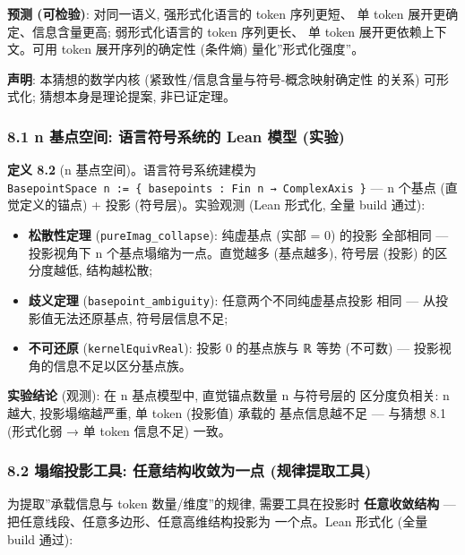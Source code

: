 \documentclass[
]{article}
\providecommand{\tightlist}{%
  \setlength{\itemsep}{0pt}\setlength{\parskip}{0pt}}
\begin{document}
\textbf{预测 (可检验)}: 对同一语义, 强形式化语言的 token 序列更短、 单
token 展开更确定、信息含量更高; 弱形式化语言的 token 序列更长、 单 token
展开更依赖上下文。可用 token 展开序列的确定性 (条件熵)
量化''形式化强度''。

\textbf{声明}: 本猜想的数学内核 (紧致性/信息含量与符号-概念映射确定性
的关系) 可形式化; 猜想本身是理论提案, 非已证定理。

\subsubsection{8.1 n 基点空间: 语言符号系统的 Lean 模型
(实验)}\label{n-ux57faux70b9ux7a7aux95f4-ux8bedux8a00ux7b26ux53f7ux7cfbux7edfux7684-lean-ux6a21ux578b-ux5b9eux9a8c}

\textbf{定义 8.2} (n 基点空间)。语言符号系统建模为
\texttt{BasepointSpace\ n\ :=\ \{\ basepoints\ :\ Fin\ n\ →\ ComplexAxis\ \}}
--- n 个基点 (直觉定义的锚点) + 投影 (符号层)。实验观测 (Lean 形式化,
全量 build 通过):

\begin{itemize}
\tightlist
\item
  \textbf{松散性定理} (\texttt{pureImag\_collapse}): 纯虚基点 (实部 = 0)
  的投影 全部相同 --- 投影视角下 n 个基点塌缩为一点。直觉越多
  (基点越多), 符号层 (投影) 的区分度越低, 结构越松散;
\item
  \textbf{歧义定理} (\texttt{basepoint\_ambiguity}):
  任意两个不同纯虚基点投影 相同 --- 从投影值无法还原基点,
  符号层信息不足;
\item
  \textbf{不可还原} (\texttt{kernelEquivReal}): 投影 0 的基点族与 ℝ 等势
  (不可数) --- 投影视角的信息不足以区分基点族。
\end{itemize}

\textbf{实验结论} (观测): 在 n 基点模型中, 直觉锚点数量 n 与符号层的
区分度负相关: n 越大, 投影塌缩越严重, 单 token (投影值) 承载的
基点信息越不足 --- 与猜想 8.1 (形式化弱 → 单 token 信息不足) 一致。

\subsubsection{8.2 塌缩投影工具: 任意结构收敛为一点
(规律提取工具)}\label{ux584cux7f29ux6295ux5f71ux5de5ux5177-ux4efbux610fux7ed3ux6784ux6536ux655bux4e3aux4e00ux70b9-ux89c4ux5f8bux63d0ux53d6ux5de5ux5177}

为提取''承载信息与 token 数量/维度''的规律, 需要工具在投影时
\textbf{任意收敛结构} --- 把任意线段、任意多边形、任意高维结构投影为
一个点。Lean 形式化 (全量 build 通过):
\end{document}
